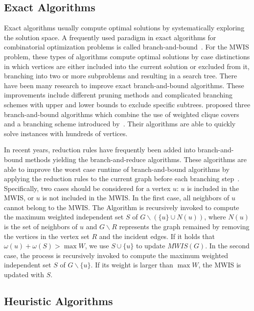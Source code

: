 \documentclass[sigconf, nonacm]{acmart}
\begin{document}
\subsection{Exact Algorithms}

Exact algorithms usually compute optimal solutions by systematically exploring the solution space. A frequently used paradigm in exact algorithms for combinatorial optimization problems is called branch-and-bound~\cite{ostergaard2002fast,warren2006combinatorial}. For the MWIS problem, these types of algorithms compute optimal solutions by case distinctions in which vertices are either included into the current solution or excluded from it, branching into two or more subproblems and resulting in a search tree. There have been many research to improve exact branch-and-bound algorithms. These improvements include different pruning methods and complicated branching schemes with upper and lower bounds to exclude specific subtrees. \citet{warren2006combinatorial} proposed three branch-and-bound algorithms which combine the use of weighted clique covers and a branching scheme introduced by~\citet{balas1986finding}. Their algorithms are able to quickly solve instances with hundreds of vertices.

In recent years, reduction rules have frequently been added into branch-and-bound methods yielding the branch-and-reduce algorithms. These algorithms are able to improve the worst case runtime of branch-and-bound algorithms by applying the reduction rules to the current graph before each branching step~\cite{fomin2009measure}. Specifically, two cases should be considered for a vertex $u$: $u$ is included in the MWIS, or $u$ is not included in the MWIS. In the first case, all neighbors of $u$ cannot belong to the MWIS. The Algorithm is recursively invoked to compute the maximum weighted independent set $S$ of $G\backslash(\{u\} \cup N(u))$, where $N(u)$ is the set of neighbors of $u$ and $G\backslash R$ represents the graph remained by removing the vertices in the vertex set $R$ and the incident edges. If it holds that $\omega(u)+\omega(S)>\max W$, we use $S\cup\{u\}$ to update $MWIS(G)$. In the second case, the process is recursively invoked to compute the maximum weighted independent set $S$ of $G\backslash\{u\}$. If its weight is larger than $\max W$, the MWIS is updated with $S$.

\subsection{Heuristic Algorithms}
\end{document}
